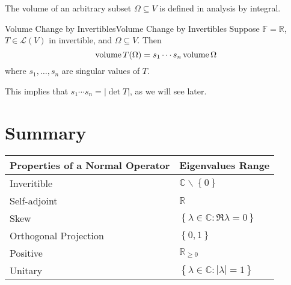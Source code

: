 \documentclass[../main.tex]{subfiles}
\begin{document}
The volume of an arbitrary subset $\Omega \subseteq V$ is defined in analysis by integral.
\begin{theorem}{Volume Change by Invertibles}{Volume Change by Invertibles}
Suppose $\mathbb{F}=\mathbb{R}$, $T\in \mathscr{L}(V)$ in invertible, and $\Omega \subseteq V$. Then
\begin{equation*}
\operatorname{volume} T(\Omega) = s_1 \cdots s_n \operatorname{volume} \Omega
\end{equation*}
where $s_1, \ldots ,s_n$ are singular values of $T$.
\end{theorem}

\begin{remark}
This implies that $s_1 \cdots s_n = \left|\det T\right|$, as we will see later.
\end{remark}

\section{Summary}
\begin{table}[H]
\centering
\begin{tabular}{|l|l|}
\hline
\textbf{Properties of a Normal Operator} & \textbf{Eigenvalues Range}\\
\hline
Inveritible & $\mathbb{C} \backslash \left\{ 0 \right\}$ \\\hline
Self-adjoint & $\mathbb{R}$ \\\hline
Skew & $\left\{ \lambda\in \mathbb{C}: \Re \lambda=0 \right\}$ \\\hline
Orthogonal Projection & $\left\{ 0,1 \right\}$ \\\hline
Positive & $\mathbb{R}_{\geq 0}$ \\\hline
Unitary & $\left\{ \lambda\in \mathbb{C}: \left|\lambda\right|=1 \right\}$ \\\hline
\end{tabular}
\end{table}
\end{document}
